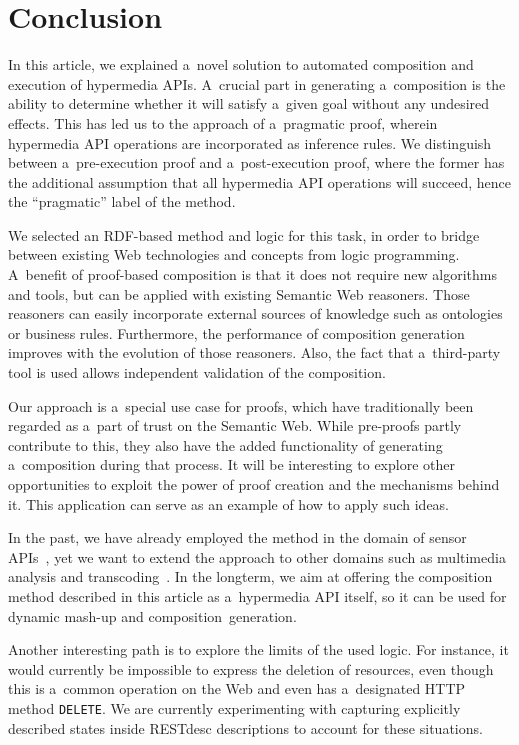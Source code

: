 \section{Conclusion}
\label{sec:Conclusion}
In this article,
we explained a~novel solution to automated composition and execution of hypermedia APIs.
A~crucial part in generating a~composition
is the ability to determine whether it will satisfy a~given goal
without any undesired effects.
This has led us to the approach of a~pragmatic proof,
wherein hypermedia API operations are incorporated as inference rules.
We distinguish between a~pre-execution proof and a~post-execution proof,
where the former has the additional assumption that all hypermedia API operations will succeed,
hence the ``pragmatic'' label of the method.

We selected an RDF-based method and logic for this task,
in order to bridge between existing Web technologies
and concepts from logic programming.
A~benefit of proof-based composition is that it does not require new algorithms and tools,
but can be applied with existing Semantic Web reasoners.
Those reasoners can easily incorporate external sources of knowledge
such as ontologies or business rules.
Furthermore, the performance of composition generation improves
with the evolution of those reasoners.
Also, the fact that a~third-party tool is used allows independent validation of the composition.

Our approach is a~special use case for proofs,
which have traditionally been regarded as a~part of trust on the Semantic Web.
While pre-proofs partly contribute to this,
they also have the added functionality of generating a~composition during that process.
It will be interesting to explore other opportunities
to exploit the power of proof creation
and the mechanisms behind it.
This application can serve as an example of how to apply such ideas.

In the past, we have already employed the method
in the domain of sensor APIs~\cite{verborgh_ssn_2012},
yet we want to extend the approach to other domains such as multimedia analysis and transcoding~\cite{verborgh_mtap_2013,vanlancker_mtap_2013}.
In the longterm, we aim at offering the composition method described in this article
as a~hypermedia API itself,
so it can be used for dynamic mash-up and composition~generation.

Another interesting path is to explore the limits of the used logic.
For instance, it would currently be impossible to express the deletion of resources,
even though this is a~common operation on the Web
and even has a~designated HTTP method \verb!DELETE!.
We are currently experimenting with capturing explicitly described states
inside RESTdesc descriptions to account for these situations.

